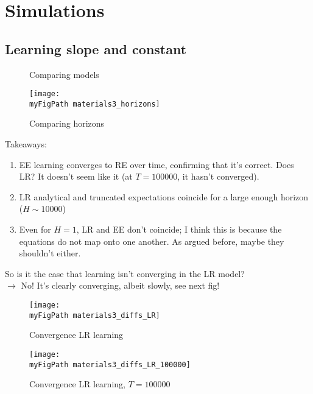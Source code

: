 \documentclass[11pt]{article}
\def \myFigPath {../figures/}
\renewcommand{\[}{\begin{equation}}
\renewcommand{\]}{\end{equation}}
\def\myBiggerFigScale{0.4}
\def\myFigScale{0.3}
\begin{document}
\newpage
\section{Simulations}	
\subsection{Learning slope and constant}
\begin{figure}[h!]
\caption{Comparing models}
\end{figure}

\newpage
\begin{figure}[h!]
\texttt{[image: \\myFigPath materials3\_horizons]}
\caption{Comparing horizons}
\end{figure}

Takeaways:
\begin{enumerate}
\item EE learning converges to RE over time, confirming that it's correct. Does LR? It doesn't seem like it (at $T=100000$, it hasn't converged).
\item LR analytical and truncated expectations coincide for a large enough horizon ($H \sim 10000$)
\item Even for $H=1$, LR and EE don't coincide; I think this is because the equations do not map onto one another. As argued before, maybe they shouldn't either.
\end{enumerate}

\newpage
So is it the case that learning isn't converging in the LR model? \\
$\rightarrow$ No! It's clearly converging, albeit slowly, see next fig!

\begin{figure}[h!]
\texttt{[image: \\myFigPath materials3\_diffs\_LR]}
\caption{Convergence LR learning}
\end{figure}

\begin{figure}[h!]
\texttt{[image: \\myFigPath materials3\_diffs\_LR\_100000]}
\caption{Convergence LR learning, $T = 100000$}
\end{figure}
\end{document}
